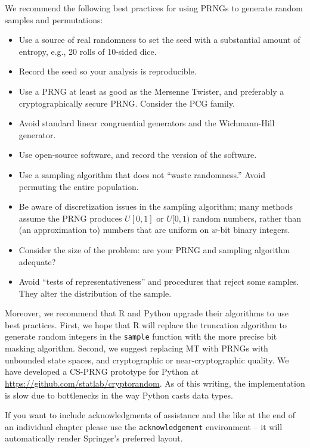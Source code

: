 \documentclass[graybox]{svmult}
\begin{document}
We recommend the following best practices for using PRNGs to generate random samples and permutations:
\begin{itemize}
\item Use a source of real randomness to set the seed with a substantial amount of entropy, e.g., 20 rolls of 10-sided dice.
\item Record the seed so your analysis is reproducible.
\item Use a PRNG at least as good as the Mersenne Twister, and preferably a cryptographically secure PRNG. Consider the PCG family. 
\item Avoid standard linear congruential generators and the Wichmann-Hill generator.
\item Use open-source software, and record the version of the software.
\item Use a sampling algorithm that does not ``waste randomness.'' Avoid permuting the entire population.
\item Be aware of discretization issues in the sampling algorithm; many methods assume the PRNG produces $U[0,1]$ or $U[0,1)$ random numbers, rather than (an approximation to) numbers that are uniform on $w$-bit binary integers.
\item Consider the size of the problem: are your PRNG and sampling algorithm adequate?
\item Avoid ``tests of representativeness'' and procedures that reject some samples. They alter the distribution of the sample.
\end{itemize}


Moreover, we recommend that R and Python upgrade their algorithms to use best practices.
First, we hope that R will replace the truncation algorithm to generate random integers in the \texttt{sample} function with the more precise bit masking algorithm.
Second, we suggest replacing MT with PRNGs with unbounded state spaces, and cryptographic or near-cryptographic quality.
We have developed a CS-PRNG prototype for Python at \url{https://github.com/statlab/cryptorandom}.
As of this writing, the implementation is slow due to bottlenecks in the way Python casts data types.




\begin{acknowledgement}
If you want to include acknowledgments of assistance and the like at the end of an individual chapter please use the \verb|acknowledgement| environment -- it will automatically render Springer's preferred layout.
\end{acknowledgement}
%



\end{document}
